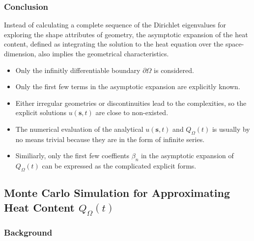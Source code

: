     
    \subsubsection{Conclusion}
        
        \par
        Instead of calculating a complete sequence of the Dirichlet eigenvalues for exploring the shape attributes of geometry, the asymptotic expansion of the heat content, defined as integrating the solution to the heat equation over the space-dimension, also implies the geometrical characteristics.  

        \begin{itemize}  
          \item Only the infinitly differentiable boundary $\partial \Omega$ is considered.
          \item Only the first few terms in the asymptotic expansion are explicitly known.
          \item Either irregular geometries or discontinuities lead to the complexities, so the explicit solutions $u(\bm{s}, t)$ are close to non-existed.
          \item The numerical evaluation of the analytical $u(\bm{s}, t)$ and $Q_{\Omega}(t)$ is usually by no means trivial because they are in the form of infinite series.
          \item Similiarly, only the first few coeffients $\beta_n$ in the asymptotic expansion of $Q_{\Omega}(t)$ can be expressed as the complicated explicit forms.
        \end{itemize}
        
        

        
  \subsection{Monte Carlo Simulation for Approximating Heat Content $Q_{\Omega}(t)$}

    \subsubsection{Background \cite{jacobs2010stochastic}}


